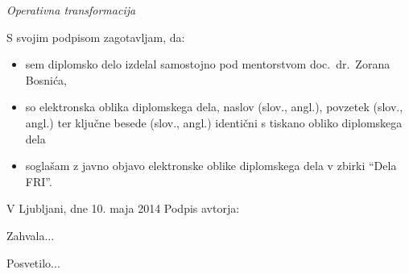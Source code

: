 \documentclass[a4paper, 12pt, twoside]{book}
\newcommand{\clearemptydoublepage}{\newpage{\pagestyle{empty}\cleardoublepage}} %
\begin{document}
\vspace{0.5cm}
{\large \emph{Operativna transformacija}}

\vspace{1.5cm}
\noindent S svojim podpisom zagotavljam, da:
\begin{itemize}
	\item sem diplomsko delo izdelal samostojno pod mentorstvom doc.\ dr.\ Zorana Bosnića,
	\item so elektronska oblika diplomskega dela, naslov (slov., angl.), povzetek (slov., angl.) ter ključne besede (slov., angl.) identični s tiskano obliko diplomskega dela
	\item soglašam z javno objavo elektronske oblike diplomskega dela v zbirki “Dela FRI”.
\end{itemize}

\vspace{1cm}
\noindent V Ljubljani, dne 10. maja 2014 \hfill Podpis avtorja:

\clearemptydoublepage

\thispagestyle{empty}
\noindent Zahvala...

\clearemptydoublepage

\thispagestyle{empty}
\noindent Posvetilo...

\clearemptydoublepage

\def\thepage{} %
\tableofcontents{}

\end{document}
